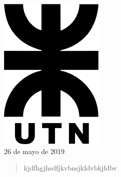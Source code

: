 \documentclass[12pt]{article}
\begin{document}
\begin{titlepage}
\begin{center}
\begin{minipage}{0.8\textwidth}
\begin{flushleft}
\end{flushleft}
\end{minipage}\\[2.5cm]







\includegraphics[width=5cm]{./logos/logo_utn.png}\\[1cm] 				%
 {\large 26 de mayo de 2019}											%

\newpage %
\end{center}

\begin{abstract}
kjdfhgjhsdfjkvbnsjkfdvbkjfdbv
\end{abstract}


\tableofcontents\vspace{2.5cm}
\listoffigures
\thispagestyle{empty}
\end{titlepage}
\newpage
\pagestyle{fancy}
\end{document}
